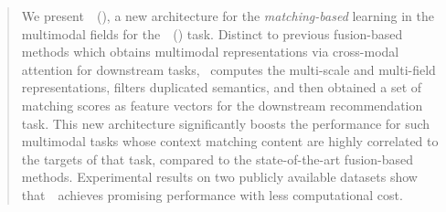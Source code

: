 \begin{abstract}
We present~\modelname~(\modelfullname), a new architecture for the \textit{matching-based} learning in the multimodal fields for the~\taskfullname~(\taskabbrname) task. 
Distinct to previous fusion-based methods which obtains multimodal representations via cross-modal attention for downstream tasks, 
\modelname~computes the multi-scale and multi-field representations, filters duplicated semantics, and then obtained a set of matching scores as feature vectors for the downstream recommendation task.
This new architecture significantly boosts the performance for such multimodal tasks whose context matching content are highly correlated to the targets of that task, compared to the state-of-the-art fusion-based methods.
Experimental results on two publicly available datasets show that~\modelname~achieves promising performance with less computational cost.
\end{abstract}